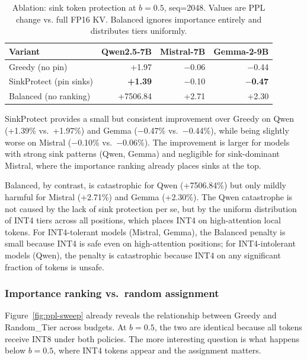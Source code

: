 \documentclass[11pt]{article}
\newcommand{\budget}{b}
\newcommand{\pct}{\%}
\theoremstyle{plain}
\theoremstyle{definition}
\begin{document}
\begin{table}[t]
\centering
\caption{Ablation: sink token protection at $\budget=0.5$, seq=2048.  Values are PPL change vs. full FP16 KV.  Balanced ignores importance entirely and distributes tiers uniformly.}
\label{tab:ablation-sink}
\small
\begin{tabular}{lrrr}
\toprule
Variant & Qwen2.5-7B & Mistral-7B & Gemma-2-9B \\
\midrule
Greedy (no pin) & +1.97 & $-$0.06 & $-$0.44 \\
SinkProtect (pin sinks) & \textbf{+1.39} & $-$0.10 & \textbf{$-$0.47} \\
Balanced (no ranking) & +7506.84 & +2.71 & +2.30 \\
\bottomrule
\end{tabular}
\end{table}

SinkProtect provides a small but consistent improvement over Greedy on Qwen (+1.39\pct{} vs.\ +1.97\pct{}) and Gemma ($-$0.47\pct{} vs.\ $-$0.44\pct{}), while being slightly worse on Mistral ($-$0.10\pct{} vs.\ $-$0.06\pct{}).  The improvement is larger for models with strong sink patterns (Qwen, Gemma) and negligible for sink-dominant Mistral, where the importance ranking already places sinks at the top.

Balanced, by contrast, is catastrophic for Qwen (+7506.84\pct{}) but only mildly harmful for Mistral (+2.71\pct{}) and Gemma (+2.30\pct{}).  The Qwen catastrophe is not caused by the lack of sink protection per se, but by the uniform distribution of INT4 tiers across all positions, which places INT4 on high-attention local tokens.  For INT4-tolerant models (Mistral, Gemma), the Balanced penalty is small because INT4 is safe even on high-attention positions; for INT4-intolerant models (Qwen), the penalty is catastrophic because INT4 on any significant fraction of tokens is unsafe.

\subsubsection{Importance ranking vs.\ random assignment}
\label{sec:ablation-ranking}

Figure~\ref{fig:ppl-sweep} already reveals the relationship between Greedy and Random\_Tier across budgets.  At $\budget=0.5$, the two are identical because all tokens receive INT8 under both policies.  The more interesting question is what happens below $\budget=0.5$, where INT4 tokens appear and the assignment matters.
\end{document}
